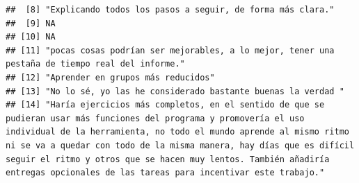\documentclass[
]{article}
\begin{document}
\begin{verbatim}
##  [8] "Explicando todos los pasos a seguir, de forma más clara."                                                                                                                                                                                                                                                                                                                                           
##  [9] NA                                                                                                                                                                                                                                                                                                                                                                                                   
## [10] NA                                                                                                                                                                                                                                                                                                                                                                                                   
## [11] "pocas cosas podrían ser mejorables, a lo mejor, tener una pestaña de tiempo real del informe."                                                                                                                                                                                                                                                                                                      
## [12] "Aprender en grupos más reducidos"                                                                                                                                                                                                                                                                                                                                                                   
## [13] "No lo sé, yo las he considerado bastante buenas la verdad "                                                                                                                                                                                                                                                                                                                                         
## [14] "Haría ejercicios más completos, en el sentido de que se pudieran usar más funciones del programa y promovería el uso individual de la herramienta, no todo el mundo aprende al mismo ritmo ni se va a quedar con todo de la misma manera, hay días que es difícil seguir el ritmo y otros que se hacen muy lentos. También añadiría entregas opcionales de las tareas para incentivar este trabajo."

\end{verbatim}
\end{document}
